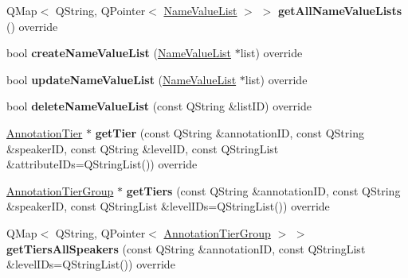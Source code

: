 \begin{DoxyCompactItemize}
Q\+Map$<$ Q\+String, Q\+Pointer$<$ \hyperlink{class_name_value_list}{Name\+Value\+List} $>$ $>$ {\bfseries get\+All\+Name\+Value\+Lists} () override
\item 
\mbox{\label{class_s_q_l_annotation_datastore_a0115ee11f0966baca4881ab4bbc1d59b}} 
bool {\bfseries create\+Name\+Value\+List} (\hyperlink{class_name_value_list}{Name\+Value\+List} $\ast$list) override
\item 
\mbox{\label{class_s_q_l_annotation_datastore_ad19a757ca9b35f0caa7e9bdec6ce7b5f}} 
bool {\bfseries update\+Name\+Value\+List} (\hyperlink{class_name_value_list}{Name\+Value\+List} $\ast$list) override
\item 
\mbox{\label{class_s_q_l_annotation_datastore_a4eca8c92d71074f262c8e68181081e70}} 
bool {\bfseries delete\+Name\+Value\+List} (const Q\+String \&list\+ID) override
\item 
\mbox{\label{class_s_q_l_annotation_datastore_a72ac7e9fadfd408d159b8c9d8664f983}} 
\hyperlink{class_annotation_tier}{Annotation\+Tier} $\ast$ {\bfseries get\+Tier} (const Q\+String \&annotation\+ID, const Q\+String \&speaker\+ID, const Q\+String \&level\+ID, const Q\+String\+List \&attribute\+I\+Ds=Q\+String\+List()) override
\item 
\mbox{\label{class_s_q_l_annotation_datastore_a34810e80d2e67c24636357b372126660}} 
\hyperlink{class_annotation_tier_group}{Annotation\+Tier\+Group} $\ast$ {\bfseries get\+Tiers} (const Q\+String \&annotation\+ID, const Q\+String \&speaker\+ID, const Q\+String\+List \&level\+I\+Ds=Q\+String\+List()) override
\item 
\mbox{\label{class_s_q_l_annotation_datastore_a7a651aafbeba2293a6800f2bf315eaed}} 
Q\+Map$<$ Q\+String, Q\+Pointer$<$ \hyperlink{class_annotation_tier_group}{Annotation\+Tier\+Group} $>$ $>$ {\bfseries get\+Tiers\+All\+Speakers} (const Q\+String \&annotation\+ID, const Q\+String\+List \&level\+I\+Ds=Q\+String\+List()) override
\item 
\mbox{\label{class_s_q_l_annotation_datastore_a6b72bc530d944792d2d89eff254d85c5}} 

\end{DoxyCompactItemize}
